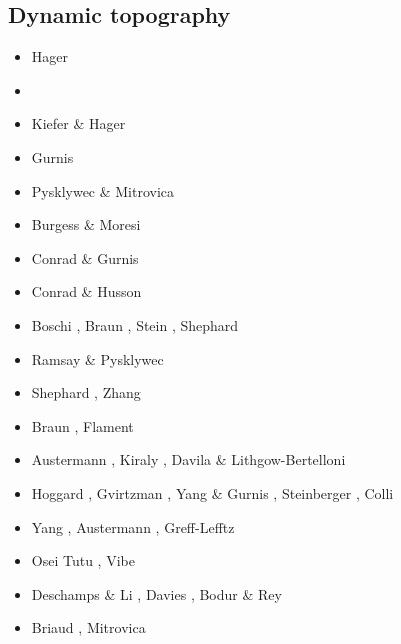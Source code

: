\subsection{Dynamic topography} 

\begin{scriptsize}
\begin{itemize}
\item[\nineteeneightyfive] Hager \etal \cite{hacr85}
\item[\nineteeneightyseven] \cite{repa87}
\item[\nineteenninetytwo] Kiefer \& Hager \cite{kiha92}
\item[\nineteenninetythree] Gurnis \cite{gurn93,gurn93b}
\item[\nineteenninetyseven] Pysklywec \& Mitrovica \cite{pymi97}
\item[\nineteenninetynine] Burgess \& Moresi \cite{bumo99}
\item[\twothousandthree] Conrad \& Gurnis \cite{cogu03}
\item[\twothousandnine] Conrad \& Husson \cite{cohu09}
\item[\twothousandten] Boschi \etal \cite{bofb10}, Braun \cite{brau10},
                       Stein \etal \cite{stfh10}, Shephard \etal \cite{shml10}
\item[\twothousandeleven] Ramsay \& Pysklywec \cite{rapy11}
\item[\twothousandtwelve] Shephard \etal \cite{shlm12}, Zhang \etal \cite{zhzf12}
\item[\twothousandthirteen] Braun \etal \cite{brrs13}, Flament \etal \cite{flgm13}
\item[\twothousandfifteen] Austermann \etal \cite{aupm15}, Kiraly \etal \cite{kiff15},
                           Davila \& Lithgow-Bertelloni \cite{dali15}
\item[\twothousandsixteen] Hoggard \etal \cite{howa16}, Gvirtzman \etal \cite{gvfb16},
                           Yang \& Gurnis \cite{yagu16}, Steinberger \cite{stei16},
                           Colli \etal \cite{cogb16}
\item[\twothousandseventeen] Yang \etal \cite{yamm17}, Austermann \etal \cite{aumh17},
                             Greff-Lefftz \etal \cite{grrb17}
\item[\twothousandeighteen] Osei Tutu \etal \cite{osss18}, Vibe \etal \cite{vibc18}
\item[\twothousandnineteen] Deschamps \& Li \cite{deli19}, Davies \etal \cite{davk19}, 
                            Bodur \& Rey \cite{bore19}
\item[\twothousandtwenty] Briaud \etal \cite{braf20}, Mitrovica \etal \cite{miac20}
\end{itemize}
\end{scriptsize}



